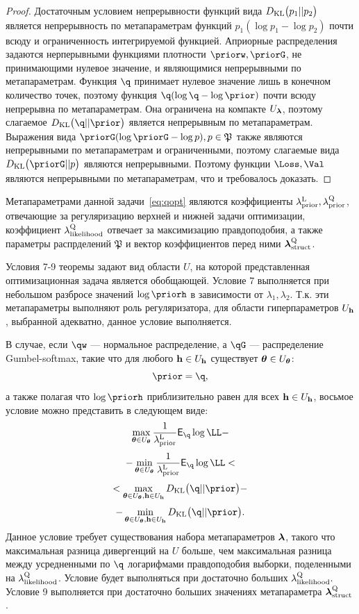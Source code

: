 \begin{proof}
Достаточным условием непрерывности функций вида $D_\text{KL}\bigl(p_1 || p_2\bigr)$ является непрерывность по метапараметрам функций $p_1 (\log{p_1} - \log{p_2})$  почти всюду и ограниченность интегрируемой функцией.  Априорные распределения задаются нерперывными функциями плотности $\priorw, \priorG$, не принимающими нулевое значение, и являющимися непрерывными по метапараметрам. Функция $\q$ принимает нулевое значение лишь в конечном количество точек, поэтому функция $\q (\log \q - \log \prior)$ почти всюду непрерывна по метапараметрам.  Она ограничена на компакте $U_{\boldsymbol{\lambda}}$, поэтому слагаемое $\KL{\q}{\prior}$ является непрерывным по метапараметрам.
Выражения вида $\priorG (\log \priorG - \log p), p \in \mathfrak{P}$ также являются непрерывными по метапараметрам и ограниченными, поэтому слагаемые вида $\KL{\priorG}{p}$ являются непрерывными. Поэтому функции $\Loss, \Val$ являются непрерывными по метапараметрам, что и требовалось доказать.
\end{proof}
Метапараметрами данной задачи~\eqref{eq:qopt} являются коэффициенты $\lambda_\text{prior}^\text{L}, \lambda_\text{prior}^\text{Q}$, отвечающие за регуляризацию верхней и нижней задачи оптимизации, коэффициент $\lambda_\text{likelihood}^\text{Q}$ отвечает за максимизацию правдоподобия, а также параметры распрделений $\mathfrak{P}$ и вектор коэффициентов перед ними $\boldsymbol{\lambda}_\text{struct}^\text{Q}$. 

Условия 7-9 теоремы задают вид области $U$, на которой представленная оптимизационная задача является обобщающей. 
Условие 7 выполняется при небольшом разбросе значений $\log \priorh$ в зависимости от $\lambda_1, \lambda_2$. Т.к. эти метапараметры выполняют роль регуляризатора, для области гиперпараметров $U_{\mathbf{h}}$, выбранной адекватно, данное условие выполняется.

В случае, если $\qw$ --- нормальное распределение, а $\qG$ --- распределение Gumbel-softmax, такие что для любого $\mathbf{h} \in U_{\mathbf{h}}$ существует $\boldsymbol{\theta} \in U_{\boldsymbol{\theta}}$:
\[
    \prior = \q,
\]
а также полагая что $\log\priorh$ приблизительно равен для всех $\mathbf{h} \in U_{\mathbf{h}}$, восьмое условие можно представить в следующем виде:
\[
\max_{\teta \in \Uteta}\frac{1}{\lamCL}\E_{\q} \log \LL - 
\]
\[
 - \min_{\teta \in \Uteta}\frac{1}{\lamCL}\E_{\q} \log \LL  <
\]
\[ 
< \max_{\teta \in \Uteta, \h \in \Uh} \KL{\q}{\prior} -
\]
\[
-\min_{\teta \in \Uteta, \h \in \Uh} \KL{\q}{\prior}.
\]
Данное условие требует существования набора метапараметров $\boldsymbol{\lambda}$, такого что максимальная разница дивергенций на $U$ больше, чем максимальная разница между усредненными по $\q$ логарифмами правдоподобия выборки, поделенными на $\lambda_\text{likelihood}^\text{Q}$. Условие будет выполняться при достаточно больших $\lambda_\text{likelihood}^\text{Q}.$
Условие 9 выполняется при достаточно больших значениях метапараметра $\boldsymbol{\lambda}_\text{struct}^\text{Q}$. 





